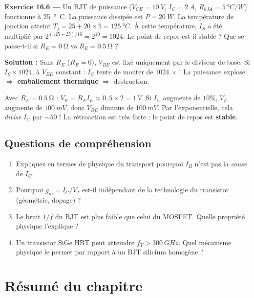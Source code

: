\documentclass[12pt,a4paper,twoside]{book}
\begin{document}
\textbf{Exercice 16.6 ---} Un BJT de puissance ($V_{CE} = \SI{10}{V}$, $I_C = \SI{2}{A}$, $R_{\theta JA} = \SI{5}{°C/W}$) fonctionne à \SI{25}{°C}. La puissance dissipée est $P = \SI{20}{W}$. La température de jonction atteint $T_j = 25 + 20\times5 = \SI{125}{°C}$. À cette température, $I_S$ a été multiplié par $2^{(125-25)/10} = 2^{10} = 1024$. Le point de repos est-il stable ? Que se passe-t-il si $R_E = \SI{0}{\ohm}$ vs $R_E = \SI{0.5}{\ohm}$ ?

\begin{pratique}
\textbf{Solution :} Sans $R_E$ ($R_E = 0$), $V_{BE}$ est fixé uniquement par le diviseur de base. Si $I_S \times 1024$, à $V_{BE}$ constant : $I_C$ tente de monter de 1024 $\times$ ! La puissance explose $\Rightarrow$ \textbf{emballement thermique} $\Rightarrow$ destruction.

Avec $R_E = \SI{0.5}{\ohm}$ : $V_E = R_E I_E \approx 0{,}5\times2 = \SI{1}{V}$. Si $I_C$ augmente de $10\%$, $V_E$ augmente de $\SI{100}{mV}$, donc $V_{BE}$ diminue de $\SI{100}{mV}$. Par l'exponentielle, cela \textit{divise} $I_C$ par $\sim 50$ ! La rétroaction est très forte : le point de repos est \textbf{stable}.
\end{pratique}

\subsection*{Questions de compréhension}

\begin{enumerate}[nosep]
\item Expliquez en termes de physique du transport pourquoi $I_B$ n'est pas la \textit{cause} de $I_C$.
\item Pourquoi $g_m = I_C/V_T$ est-il indépendant de la technologie du transistor (géométrie, dopage) ?
\item Le bruit $1/f$ du BJT est plus faible que celui du MOSFET. Quelle propriété physique l'explique ?
\item Un transistor SiGe HBT peut atteindre $f_T > \SI{300}{GHz}$. Quel mécanisme physique le permet par rapport à un BJT silicium homogène ?
\end{enumerate}

\section*{Résumé du chapitre}
\end{document}

